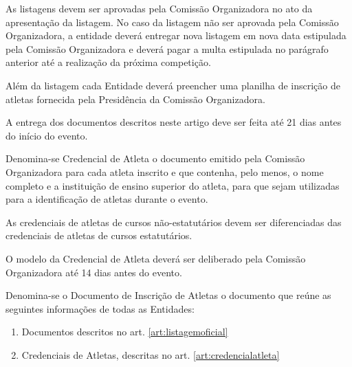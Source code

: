 \begin{article}
	\begin{xparagraph}
	    As listagens devem ser aprovadas pela Comissão Organizadora no ato da apresentação da listagem. No caso da listagem não ser aprovada pela Comissão Organizadora, a entidade deverá entregar nova listagem em nova data estipulada pela Comissão Organizadora e deverá pagar a multa estipulada no parágrafo anterior até a realização da próxima competição.
	\end{xparagraph}

	\begin{xparagraph}
	    Além da listagem cada Entidade deverá preencher uma planilha de inscrição de atletas fornecida pela Presidência da Comissão Organizadora.
	\end{xparagraph}

	\begin{xparagraph}
	    A entrega dos documentos descritos neste artigo deve ser feita até 21 dias antes do início do evento.
	\end{xparagraph}
\end{article}

\begin{article}
    \label{art:credencialatleta}
    Denomina-se Credencial de Atleta o documento emitido pela Comissão Organizadora para cada atleta inscrito e que contenha, pelo menos, o nome completo e a instituição de ensino superior do atleta, para que sejam utilizadas para a identificação de atletas durante o evento.

	\begin{xparagraph}
	    As credenciais de atletas de cursos não-estatutários devem ser diferenciadas das credenciais de atletas de cursos estatutários.
	\end{xparagraph}

	\begin{xparagraph}
	    O modelo da Credencial de Atleta deverá ser deliberado pela Comissão Organizadora até 14 dias antes do evento.
	\end{xparagraph}
\end{article}

\begin{article}
    Denomina-se o Documento de Inscrição de Atletas o documento que reúne as seguintes informações de todas as Entidades:
	\begin{enumerate}[noitemsep,leftmargin=2\parindent]
		\item Documentos descritos no art. \ref{art:listagemoficial}\ulo
		\item Credenciais de Atletas, descritas no art. \ref{art:credencialatleta}\ulo
	\end{enumerate}
\end{article}

